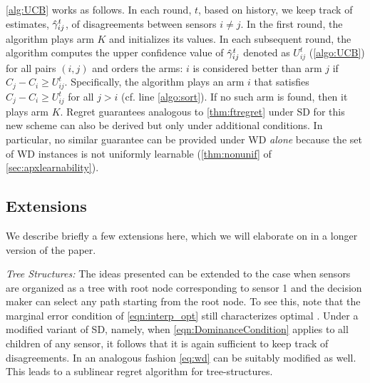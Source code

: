 \cref{alg:UCB}  works as follows. In each round, $t$, based on history, we keep track of estimates, $\hat{\gamma}^t_{ij}$, of disagreements between sensors $i\ne j$.  %
In the first round, the algorithm plays arm $K$ and initializes its values. In each subsequent round, the algorithm computes the upper confidence value of $\hat{\gamma}^t_{ij}$ denoted as $U^t_{ij}$ (\ref{algo:UCB}) for all pairs $(i,j)$ and orders the arms: $i$ is considered better than arm $j$ if $C_j-C_i \geq U^t_{ij}$. Specifically, the algorithm plays an arm $i$ that satisfies $C_j-C_i \geq U^t_{ij}$ for all $j>i$ (cf. line \ref{algo:sort}). If no such arm is found, then it plays arm $K$.  
 Regret guarantees analogous to \cref{thm:ftregret} under SD for this new scheme can also be derived but only under additional conditions. In particular, no similar guarantee can be provided under WD \emph{alone} because the set of WD instances is not uniformly learnable (\cref{thm:nonunif} of \cref{sec:apxlearnability}). 
\vspace{-8pt}
%
\subsection{Extensions} 
We describe briefly a few extensions here, which we will elaborate on in a longer version of the paper.

\noindent
{\it Tree Structures:}
The ideas presented can be extended to the case when sensors are organized as a tree with root node corresponding to sensor 1 and the decision maker can select any path starting from the root node. To see this, note that the marginal error condition of \cref{eqn:interp_opt} still characterizes optimal \ses. Under a modified variant of SD, namely, when \cref{eqn:DominanceCondition} applies to all children of any sensor, it follows that it is again sufficient to keep track of disagreements. In an analogous fashion \cref{eq:wd} can be suitably modified as well. This leads to a sublinear regret algorithm for tree-structures. %

